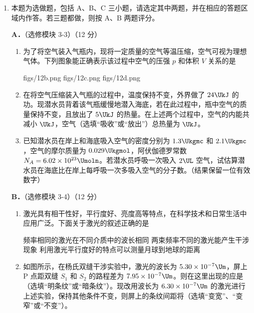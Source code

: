 \documentclass[\gkver]{gaokaozhenti}
\begin{document}
\begin{enumerate}
{（2）描点用光滑的曲线作图（如图）。


（3）同意。在 $v-t$ 图象中，速度越大时加速度越小，小车受到的合力越小，则小车受空气阻力越大。
}

\item
本题为选做题，包括 A、B、C 三小题，请选定其中两题，并在相应的答题区域内作答。若三题都做，则按 A、B 两题评分。

\textbf{A．}（选修模块 3-3）（12 分）

\begin{enumerate}
	\item
	为了将空气装入气瓶内，现将一定质量的空气等温压缩，空气可视为理想气体。下列图象能正确表示该过程中空气的压强 $p$ 和体积 $V$ 关系的是

	{figs/12b.png}
	{figs/12c.png}
	{figs/12d.png}
	\item
	在将空气压缩装入气瓶的过程中，温度保持不变，外界做了 $24\UkJ$ 的功。现潜水员背着该气瓶缓慢地潜入海底，若在此过程中，瓶中空气的质量保持不变，且放出了 $5\UkJ$ 的热量。在上述两个过程中，空气的内能共减小 $\UkJ$，空气（选填“吸收”或“放出”）总热量为 $\UkJ$。
	\item
	已知潜水员在岸上和海底吸入空气的密度分别为 $1.3\Ukgmc$ 和 $2.1\Ukgmc$，空气的摩尔质量为 $0.029\Ukgmol$，阿伏伽德罗常数 $N_{A}=6.02\times10^{23}\Umoln$。若潜水员呼吸一次吸入 $2\UL$ 空气，试估算潜水员在海底比在岸上每呼吸一次多吸入空气的分子数。（结果保留一位有效数字）
\end{enumerate}

\textbf{B．}（选修模块 3-4）（12 分）

\begin{enumerate}
	\item
	激光具有相干性好，平行度好、亮度高等特点，在科学技术和日常生活中应用广泛。下面关于激光的叙述正确的是

	{频率相同的激光在不同介质中的波长相同}
	{两束频率不同的激光能产生干涉现象}
	{利用激光平行度好的特点可以测量月球到地球的距离}
	\item
	如图所示，在杨氏双缝干涉实验中，激光的波长为 $5.30\times10^{-7}\Um$，屏上 P 点距双缝 $S_{1}$ 和 $S_{2}$ 的路程差为 $7.95\times10^{-7}\Um$。则在这里出现的应是（选填“明条纹”或“暗条纹”）。现改用波长为 $6.30\times10^{-7}\Um$ 的激光进行上述实验，保持其他条件不变，则屏上的条纹间距将（选填“变宽”、“变窄”或“不变”）。


\end{enumerate}
\end{enumerate}
\end{document}
